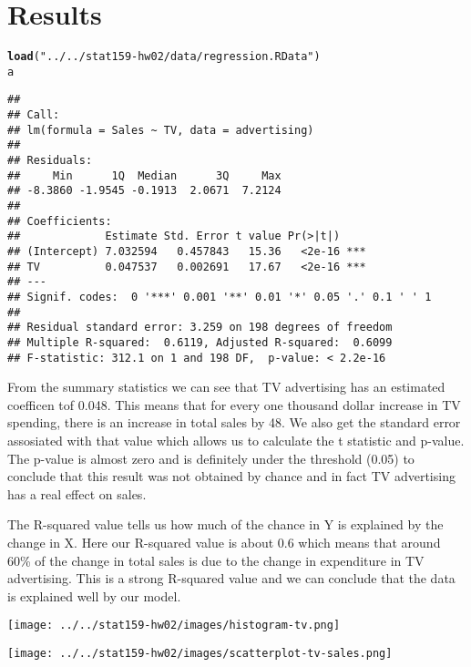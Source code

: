 \documentclass{article}\usepackage[]{graphicx}\usepackage[]{color}
\makeatletter
\newcommand{\hlstr}[1]{\textcolor[rgb]{0.192,0.494,0.8}{#1}}%
\newcommand{\hlstd}[1]{\textcolor[rgb]{0.345,0.345,0.345}{#1}}%
\newcommand{\hlkwd}[1]{\textcolor[rgb]{0.737,0.353,0.396}{\textbf{#1}}}%
\newenvironment{kframe}{%
 \def\at@end@of@kframe{}%
 \ifinner\ifhmode%
  \def\at@end@of@kframe{\end{minipage}}%
  \begin{minipage}{\columnwidth}%
 \fi\fi%
 \def\FrameCommand##1{\hskip\@totalleftmargin \hskip-\fboxsep
 \colorbox{shadecolor}{##1}\hskip-\fboxsep
     \hskip-\linewidth \hskip-\@totalleftmargin \hskip\columnwidth}%
 \MakeFramed {\advance\hsize-\width
   \@totalleftmargin\z@ \linewidth\hsize
   \@setminipage}}%
 {\par\unskip\endMakeFramed%
 \at@end@of@kframe}
\newenvironment{knitrout}{}{} %
\makeatother
\begin{document}
\section{Results}

\begin{knitrout}
\color{fgcolor}\begin{kframe}
\begin{alltt}
\hlkwd{load}\hlstd{(}\hlstr{"../../stat159-hw02/data/regression.RData"}\hlstd{)}
\hlstd{a}
\end{alltt}
\begin{verbatim}
## 
## Call:
## lm(formula = Sales ~ TV, data = advertising)
## 
## Residuals:
##     Min      1Q  Median      3Q     Max 
## -8.3860 -1.9545 -0.1913  2.0671  7.2124 
## 
## Coefficients:
##             Estimate Std. Error t value Pr(>|t|)    
## (Intercept) 7.032594   0.457843   15.36   <2e-16 ***
## TV          0.047537   0.002691   17.67   <2e-16 ***
## ---
## Signif. codes:  0 '***' 0.001 '**' 0.01 '*' 0.05 '.' 0.1 ' ' 1
## 
## Residual standard error: 3.259 on 198 degrees of freedom
## Multiple R-squared:  0.6119,	Adjusted R-squared:  0.6099 
## F-statistic: 312.1 on 1 and 198 DF,  p-value: < 2.2e-16
\end{verbatim}
\end{kframe}
\end{knitrout}

From the summary statistics we can see that TV advertising has an estimated coefficen tof 0.048. This means that for every one thousand dollar increase in TV spending, there is an increase in total sales by 48. We also get the standard error assosiated with that value which allows us to calculate the t statistic and p-value. The p-value is almost zero and is definitely under the threshold (0.05) to conclude that this result was not obtained by chance and in fact TV advertising has a real effect on sales. 

The R-squared value tells us how much of the chance in Y is explained by the change in X. Here our R-squared value is about 0.6 which means that around 60\% of the change in total sales is due to the change in expenditure in TV advertising. This is a strong R-squared value and we can conclude that the data is explained well by our model. 

\texttt{[image: ../../stat159-hw02/images/histogram-tv.png]}
 
\centerline{\texttt{[image: ../../stat159-hw02/images/scatterplot-tv-sales.png]}}
 
\end{document}
